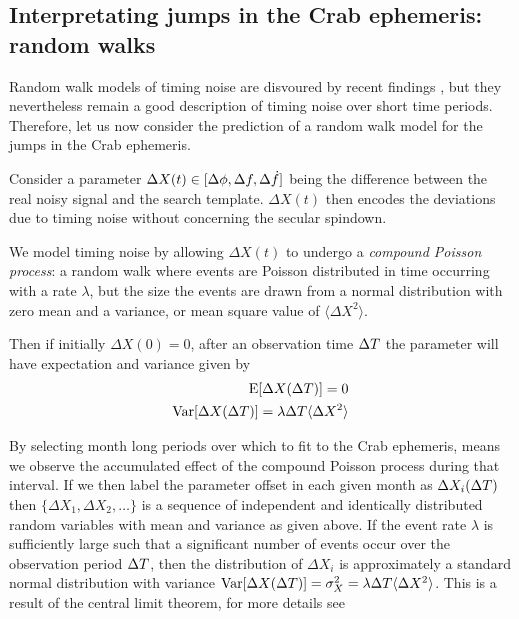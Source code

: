 \documentclass[../full_thesis/full_thesis.tex]{subfiles}
\begin{document}
{\color{blue}
\subsection{Interpretating jumps in the Crab ephemeris: random walks}
\label{sec: physical interpretation of the monthly ephemeris}

Random walk models of timing noise are disvoured by recent findings
\citep{Hobbs2010}, but they nevertheless remain a good description of timing
noise over short time periods. Therefore, let us now consider the prediction of
a random walk model for the jumps in the Crab ephemeris.

Consider a parameter $\Delta X(t) \in [\Delta\phi, \Delta f,\Delta\dot{f}]$ being
the difference between the real noisy signal and the search template. $\Delta
X(t)$ then encodes the deviations due to timing noise without concerning the secular
spindown.

We model timing noise by allowing $\Delta X(t)$ to undergo a \emph{compound
Poisson process}: a random walk where events are Poisson distributed in time
occurring with a rate $\lambda$, but the size the events are drawn from a
normal distribution with zero mean and a variance, or mean square value of
$\langle\Delta X^{2}\rangle$.

Then if initially $\Delta X(0)=0$, after an observation time $\Delta T$  the
parameter will have expectation
and variance given by
\begin{align}
\textrm{E}[\Delta X(\Delta T)] = 0
\label{eqn: Poisson expectation} \\
\textrm{Var}[\Delta X(\Delta T)] = \lambda \Delta T \langle\Delta X^{2}\rangle
\label{eqn: Poisson variance}
\end{align}

By selecting month long periods over which to fit to the Crab ephemeris, means
we observe the accumulated effect of the compound Poisson process during that
interval. If we then label the parameter offset in each given month as $\Delta
X_{i}(\Delta T)$ then $\{\Delta X_{1}, \Delta X_{2}, \dots\}$ is a sequence of
independent and identically distributed random variables with mean and variance
as given above. If the event rate $\lambda$ is sufficiently large such that a
significant number of events occur over the observation period $\Delta T$, then the
distribution of $\Delta X_{i}$ is approximately a standard normal distribution
with variance $\textrm{Var}[\Delta X(\Delta T)] =\sigma_{X}^{2} = \lambda \Delta T
\langle\Delta X^{2}\rangle$. This is a result of the central limit theorem, for
more details see \citet{Feller1968}

}
\end{document}
